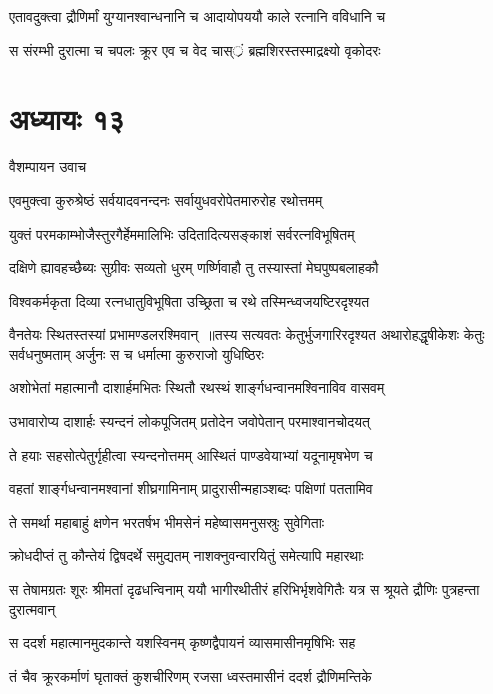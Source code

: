 \twolineshloka
{एतावदुक्त्वा द्रौणिर्मां युग्यानश्वान्धनानि च}
{आदायोपययौ काले रत्नानि वविधानि च}


\twolineshloka
{स संरम्भी दुरात्मा च चपलः क्रूर एव च}
{वेद चास््रं ब्रह्मशिरस्तस्माद्रक्ष्यो वृकोदरः}


\chapter{अध्यायः १३}
\twolineshloka
{वैशम्पायन उवाच}
{}


\twolineshloka
{एवमुक्त्वा कुरुश्रेष्ठं सर्वयादवनन्दनः}
{सर्वायुधवरोपेतमारुरोह रथोत्तमम्}


\twolineshloka
{युक्तं परमकाम्भोजैस्तुरगैर्हेममालिभिः}
{उदितादित्यसङ्काशं सर्वरत्नविभूषितम्}


\twolineshloka
{दक्षिणे ह्यावहच्छैब्यः सुग्रीवः सव्यतो धुरम्}
{णर्ष्णिवाहौ तु तस्यास्तां मेघपुष्पबलाहकौ}


\twolineshloka
{विश्वकर्मकृता दिव्या रत्नधातुविभूषिता}
{उच्छ्रिता च रथे तस्मिन्ध्वजयष्टिरदृश्यत}


वैनतेयः स्थितस्तस्यां प्रभामण्डलरश्मिवान् ॥तस्य सत्यवतः केतुर्भुजगारिरदृश्यत
\twolineshloka
{अथारोहद्धृषीकेशः केतुः सर्वधनुष्मताम्}
{अर्जुनः स च धर्मात्मा कुरुराजो युधिष्ठिरः}


\twolineshloka
{अशोभेतां महात्मानौ दाशार्हमभितः स्थितौ}
{रथस्थं शार्ङ्गधन्वानमश्विनाविव वासवम्}


\twolineshloka
{उभावारोप्य दाशार्हः स्यन्दनं लोकपूजितम्}
{प्रतोदेन जवोपेतान् परमाश्वानचोदयत्}


\twolineshloka
{ते हयाः सहसोत्पेतुर्गृहीत्वा स्यन्दनोत्तमम्}
{आस्थितं पाण्डवेयाभ्यां यदूनामृषभेण च}


\twolineshloka
{वहतां शार्ङ्गधन्वानमश्वानां शीघ्रगामिनाम्}
{प्रादुरासीन्महाञ्शब्दः पक्षिणां पततामिव}


\twolineshloka
{ते समर्था महाबाहुं क्षणेन भरतर्षभ}
{भीमसेनं महेष्वासमनुसस्रुः सुवेगिताः}


\twolineshloka
{क्रोधदीप्तं तु कौन्तेयं द्विषदर्थे समुद्यतम्}
{नाशक्नुवन्वारयितुं समेत्यापि महारथाः}


\threelineshloka
{स तेषामग्रतः शूरः श्रीमतां दृढधन्विनाम्}
{ययौ भागीरथीतीरं हरिभिर्भृशवेगितैः}
{यत्र स श्रूयते द्रौणिः पुत्रहन्ता दुरात्मवान्}


\twolineshloka
{स ददर्श महात्मानमुदकान्ते यशस्विनम्}
{कृष्णद्वैपायनं व्यासमासीनमृषिभिः सह}


\twolineshloka
{तं चैव क्रूरकर्माणं घृताक्तं कुशचीरिणम्}
{रजसा ध्वस्तमासीनं ददर्श द्रौणिमन्तिके}



